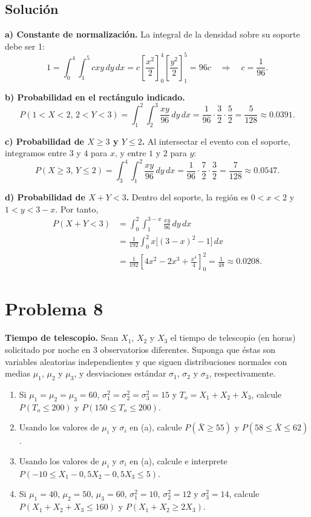 \documentclass[a4paper]{article}
\begin{document}
\subsection{Solución}

\textbf{a) Constante de normalización.} La integral de la densidad sobre su soporte debe ser 1:
\[
1=\int_0^4\int_1^5 cxy\,dy\,dx
=c\left[\frac{x^2}{2}\right]_0^4\left[\frac{y^2}{2}\right]_1^5
=96c
\quad\Rightarrow\quad \boxed{c=\frac{1}{96}}.
\]

\textbf{b) Probabilidad en el rectángulo indicado.}
\[
P(1<X<2,\,2<Y<3)
=\int_1^2\int_2^3\frac{xy}{96}\,dy\,dx
=\frac{1}{96}\cdot\frac{3}{2}\cdot\frac{5}{2}
=\boxed{\frac{5}{128}\approx 0.0391}.
\]

\textbf{c) Probabilidad de $X\ge 3$ y $Y\le 2$.} Al intersectar el evento con el soporte, integramos entre $3$ y $4$ para $x$, y entre $1$ y $2$ para $y$:
\[
P(X\ge 3,\,Y\le 2)
=\int_3^4\int_1^2\frac{xy}{96}\,dy\,dx
=\frac{1}{96}\cdot\frac{7}{2}\cdot\frac{3}{2}
=\boxed{\frac{7}{128}\approx 0.0547}.
\]

\textbf{d) Probabilidad de $X+Y<3$.} Dentro del soporte, la región es $0<x<2$ y $1<y<3-x$. Por tanto,
\begin{align*}
P(X+Y<3)
&=\int_0^2\int_1^{3-x}\frac{xy}{96}\,dy\,dx\\
&=\frac{1}{192}\int_0^2 x\bigl[(3-x)^2-1\bigr]\,dx\\
&=\frac{1}{192}\left[4x^2-2x^3+\frac{x^4}{4}\right]_0^2
=\boxed{\frac{1}{48}\approx 0.0208}.
\end{align*}

\section{Problema 8}
\textbf{Tiempo de telescopio.} Sean $X_1$, $X_2$ y $X_3$ el tiempo de telescopio (en horas) solicitado por noche en 3 observatorios diferentes. Suponga que éstas son variables aleatorias independientes y que siguen distribuciones normales con medias $\mu_1$, $\mu_2$ y $\mu_3$, y desviaciones estándar $\sigma_1$, $\sigma_2$ y $\sigma_3$, respectivamente.

\begin{enumerate}[label=\alph*)]
    \item Si $\mu_1=\mu_2=\mu_3=60$, $\sigma_1^2=\sigma_2^2=\sigma_3^2=15$ y $T_o=X_1+X_2+X_3$, calcule $P(T_o\le 200)$ y $P(150\le T_o\le 200)$.
    \item Usando los valores de $\mu_i$ y $\sigma_i$ en (a), calcule $P(\bar{X}\ge 55)$ y $P(58\le\bar{X}\le 62)$.
    \item Usando los valores de $\mu_i$ y $\sigma_i$ en (a), calcule e interprete $P(-10\le X_1-0{,}5X_2-0{,}5X_3\le 5)$.
    \item Si $\mu_1=40$, $\mu_2=50$, $\mu_3=60$, $\sigma_1^2=10$, $\sigma_2^2=12$ y $\sigma_3^2=14$, calcule $P(X_1+X_2+X_3\le 160)$ y $P(X_1+X_2\ge 2X_3)$.
\end{enumerate}
\end{document}
